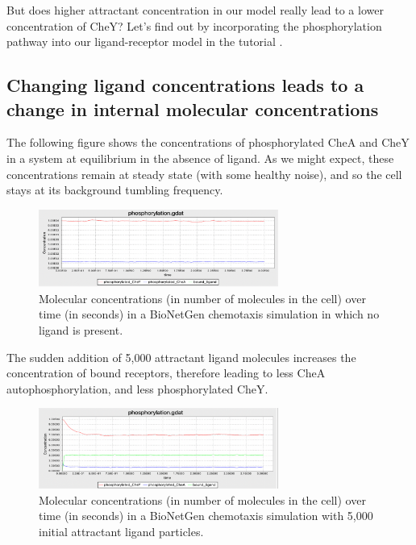 But does higher attractant concentration in our model really lead to a lower concentration of CheY? Let's find out by incorporating the phosphorylation pathway into our ligand-receptor model in the tutorial .


\FloatBarrier
{}
{}
\subsection{Changing ligand concentrations leads to a change in internal molecular concentrations}

The following figure shows the concentrations of phosphorylated CheA and CheY in a system at equilibrium in the absence of ligand. As we might expect, these concentrations remain at steady state (with some healthy noise), and so the cell stays at its background tumbling frequency.

\begin{figure}[h]
\centering
\mySfFamily
\includegraphics[width = 0.7\textwidth]{../images/chemotaxis_tutorial5.png}
\caption{Molecular concentrations (in number of molecules in the cell) over time (in seconds) in a BioNetGen chemotaxis simulation in which no ligand is present.}
\label{fig:chemotaxis_tutorial5}
\end{figure}

The sudden addition of 5,000 attractant ligand molecules increases the concentration of bound receptors, therefore leading to less CheA autophosphorylation, and less phosphorylated CheY.

\begin{figure}[h]
\centering
\mySfFamily
\includegraphics[width = 0.7\textwidth]{../images/chemotaxis_tutorial6.png}
\caption{Molecular concentrations (in number of molecules in the cell) over time (in seconds) in a BioNetGen chemotaxis simulation with 5,000 initial attractant ligand particles.}
\label{fig:chemotaxis_tutorial6}
\end{figure}


